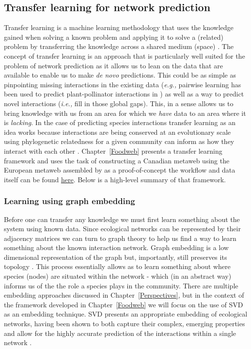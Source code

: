 \subsection{Transfer learning for network prediction}

Transfer learning is a machine learning methodology that uses the 
knowledge gained when solving a known problem and
applying it to solve a (related) problem by transferring the knowledge
across a shared medium (space) \cite{Torrey2010TraLea, Pan2010SurTra}.
The concept of transfer learning is
an approach that is particularly well suited for the problem of network
prediction as it allows us to lean on the data that are available to 
enable us to make \emph{de novo} predictions. This could be as simple
as pinpointing missing interactions in the existing data 
(\emph{e.g.,} pairwise learning has been used to predict plant-pollinator
interactions in \cite{Stock2021PaiLea}) as well as a way to predict
novel interactions (\emph{i.e.,} fill in those global gaps). This,
in a sense allows us to bring knowledge with us from an area for
which we \emph{have} data to an area where it is \emph{lacking}. In the
case of predicting species interactions transfer learning as an idea 
works because interactions are being conserved at an evolutionary scale using
phylogenetic relatedness for a given community can inform as how they
interact with each other \cite{Davies2021EcoRed, Elmasri2020HieBay,
Gomez2010EcoInt}. Chapter~\ref{Foodweb} presents a transfer learning framework
and uses the task of constructing a Canadian metaweb using the European metaweb
assembled by \cite{Maiorano2020TetSpe} as a proof-of-concept the workflow and
data itself can be found \href{https://osf.io/2zwqm/}{here}. Below is a
high-level summary of that framework.

\subsubsection{Learning using graph embedding}

Before one can transfer any knowledge we must first learn something about
the system using known data. Since ecological networks can be represented
by their adjacency matrices we can turn to graph theory to help us find a
way to learn something about the known interaction network. Graph embedding
is a low dimensional representation of the graph but, importantly, still
preserves its topology \cite{Yan2005Graph}. This process essentially allows
as to learn something about where species (nodes) are situated within the
network - which (in an abstract way) informs us of the the role a species
plays in the community. There are multiple embedding approaches discussed
in Chapter~\ref{Perspectives}, but in the context of the framework developed
in Chapter~\ref{Foodweb} we will focus on the use of SVD as an embedding 
technique. SVD presents an appropriate embedding of ecological networks, having
been shown to both capture their complex, emerging properties
\cite{Strydom2021SvdEnt} and allow for the highly accurate prediction
of the interactions within a single network \cite{Poisot2021ImpMam}.

